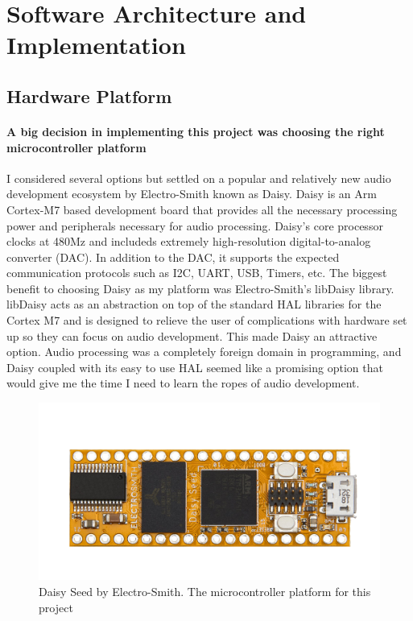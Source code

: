 \documentclass[acmlarge,screen]{acmart}
\begin{document}
\section{Software Architecture and Implementation}

\subsection{Hardware Platform}
	\paragraph{A big decision in implementing this project was choosing the right microcontroller platform} I considered several options but settled on a popular and relatively new audio development ecosystem by Electro-Smith known as Daisy. Daisy is an Arm Cortex-M7 based development board that provides all the necessary processing power and peripherals necessary for audio processing. Daisy's core processor clocks at 480Mz and includeds extremely high-resolution digital-to-analog converter (DAC). In addition to the DAC, it supports the expected communication protocols such as I2C, UART, USB, Timers, etc. The biggest benefit to choosing Daisy as my platform was Electro-Smith's libDaisy library. libDaisy acts as an abstraction on top of the standard HAL libraries for the Cortex M7 and is designed to relieve the user of complications with hardware set up so they can focus on audio development. This made Daisy an attractive option. Audio processing was a completely foreign domain in programming, and Daisy coupled with its easy to use HAL seemed like a promising option that would give me the time I need to learn the ropes of audio development.
	
	\begin{figure}
		\includegraphics[width=\linewidth]{daisy_promo_pic}
		\caption{Daisy Seed by Electro-Smith. The microcontroller platform for this project}
		\centering
	\end{figure}
\end{document}
